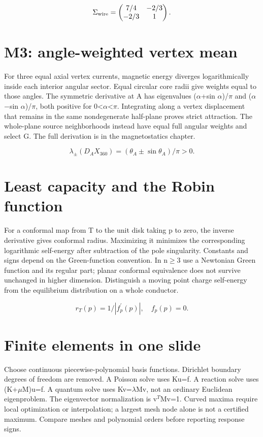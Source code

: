 \documentclass[11pt,oneside,openany]{book}
\begin{document}
\[\Sigma_{\rm wire}=\begin{pmatrix}7/4&-2/3\\-2/3&1\end{pmatrix}.\]


\section{M3: angle-weighted vertex mean}\label{sec:slide96}

For three equal axial vertex currents, magnetic energy diverges logarithmically inside each interior angular sector. Equal circular core radii give weights equal to those angles. The symmetric derivative at A has eigenvalues (\ensuremath{\alpha}+sin \ensuremath{\alpha})/\ensuremath{\pi} and (\ensuremath{\alpha}\ensuremath{-}sin \ensuremath{\alpha})/\ensuremath{\pi}, both positive for 0<\ensuremath{\alpha}<\ensuremath{\pi}. Integrating along a vertex displacement that remains in the same nondegenerate half-plane proves strict attraction. The whole-plane source neighborhoods instead have equal full angular weights and select G. The full derivation is in the magnetostatics chapter.


\[\lambda_\pm(D_AX_{360})=(\theta_A\pm\sin\theta_A)/\pi>0.\]


\section{Least capacity and the Robin function}\label{sec:slide97}

For a conformal map from T to the unit disk taking p to zero, the inverse derivative gives conformal radius. Maximizing it minimizes the corresponding logarithmic self-energy after subtraction of the pole singularity. Constants and signs depend on the Green-function convention. In n\ensuremath{\ge}3 use a Newtonian Green function and its regular part; planar conformal equivalence does not survive unchanged in higher dimension. Distinguish a moving point charge self-energy from the equilibrium distribution on a whole conductor.


\[r_T(p)=1/|f_p^\prime(p)|,\quad f_p(p)=0.\]


\section{Finite elements in one slide}\label{sec:slide98}

Choose continuous piecewise-polynomial basis functions. Dirichlet boundary degrees of freedom are removed. A Poisson solve uses Ku=f. A reaction solve uses (K+\ensuremath{\mu}M)u=f. A quantum solve uses Kv=\ensuremath{\lambda}Mv, not an ordinary Euclidean eigenproblem. The eigenvector normalization is v\ensuremath{^T}Mv=1. Curved maxima require local optimization or interpolation; a largest mesh node alone is not a certified maximum. Compare meshes and polynomial orders before reporting response signs.
\end{document}

